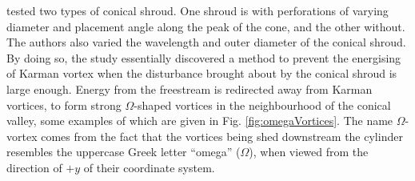 \documentclass[oneside]{utmthesis}
\begin{document}
  \noindent \citet{Lin2018} tested two types of conical shroud. One shroud is with perforations of varying diameter and placement angle along the peak of the cone, and the other without. The authors also varied the wavelength and outer diameter of the conical shroud. By doing so, the study essentially discovered a method to prevent the energising of Karman vortex when the disturbance brought about by the conical shroud is large enough. Energy from the freestream is redirected away from Karman vortices, to form strong $\Omega$-shaped vortices in the neighbourhood of the conical valley, some examples of which are given in Fig. \ref{fig:omegaVortices}. The name $\Omega$-vortex comes from the fact that the vortices being shed downstream the cylinder resembles the uppercase Greek letter ``omega'' ($\Omega$), when viewed from the direction of $+y$ of their coordinate system.
\end{document}
